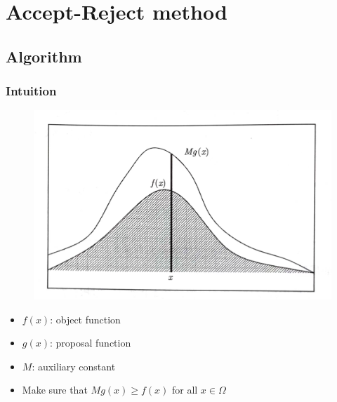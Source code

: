\section{Accept-Reject method}
\subsection{Algorithm}

\begin{frame}
    \frametitle{Intuition}

    \begin{figure}
        \begin{center}
            \includegraphics[width = .58\linewidth]{image1.png}
        \end{center}
    \end{figure}

    \begin{itemize}
        \item \(f(x)\): object function
        \item \(g(x)\): proposal function
        \item \(M\): auxiliary constant
        \item Make sure that \(Mg(x)\geq f(x)\) for all \(x \in \Omega\)
    \end{itemize}

\end{frame}

